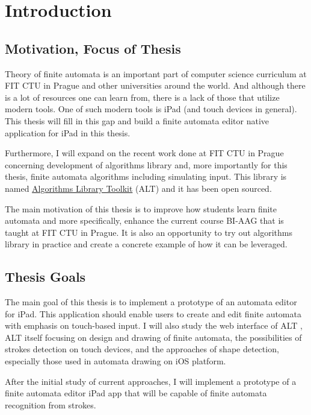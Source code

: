\chapter{Introduction}
\setcounter{page}{1}

\section{Motivation, Focus of Thesis}

Theory of finite automata is an important part of computer science curriculum at FIT CTU in Prague and other universities around the world. And although there is a lot of resources one can learn from, there is a lack of those that utilize modern tools. One of such modern tools is iPad (and touch devices in general). This thesis will fill in this gap and build a finite automata editor native application for iPad in this thesis.

Furthermore, I will expand on the recent work done at FIT CTU in Prague concerning development of algorithms library and, more importantly for this thesis, finite automata algorithms including simulating input. This library is named \href{https://alt.fit.cvut.cz/}{Algorithms Library Toolkit} (ALT) \cite{alt} and it has been open sourced.

The main motivation of this thesis is to improve how students learn finite automata and more specifically, enhance the current course BI-AAG that is taught at FIT CTU in Prague. It is also an opportunity to try out algorithms library in practice and create a concrete example of how it can be leveraged.

\section{Thesis Goals}

The main goal of this thesis is to implement a prototype of an automata editor for iPad. This application should enable users to create and edit finite automata with emphasis on touch-based input.
I will also study the web interface of ALT \cite{web-alt}, ALT itself focusing on design and drawing of finite automata, the possibilities of strokes detection on touch devices, and the approaches of shape detection, especially those used in automata drawing on iOS platform.

After the initial study of current approaches, I will implement a prototype of a finite automata editor iPad app that will be capable of finite automata recognition from strokes.

